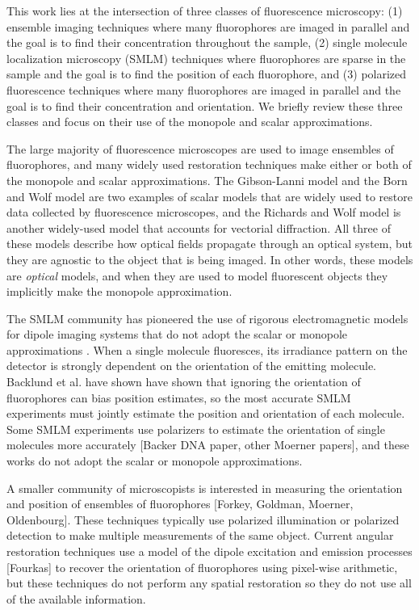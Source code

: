 \documentclass[]{osa-article}
\begin{document}
This work lies at the intersection of three classes of fluorescence microscopy:
(1) ensemble imaging techniques where many fluorophores are imaged in parallel
and the goal is to find their concentration throughout the sample, (2) single
molecule localization microscopy (SMLM) techniques where fluorophores are sparse
in the sample and the goal is to find the position of each fluorophore, and (3)
polarized fluorescence techniques where many fluorophores are imaged in parallel
and the goal is to find their concentration and orientation. We briefly review
these three classes and focus on their use of the monopole and scalar
approximations.

The large majority of fluorescence microscopes are used to image ensembles of
fluorophores, and many widely used restoration techniques make either or both of
the monopole and scalar approximations. The Gibson-Lanni model \cite{gibson89}
and the Born and Wolf model \cite{born1980} are two examples of scalar models
that are widely used to restore data collected by fluorescence microscopes, and
the Richards and Wolf model \cite{richards} is another widely-used model that
accounts for vectorial diffraction. All three of these models describe how
optical fields propagate through an optical system, but they are agnostic to the
object that is being imaged. In other words, these models are \textit{optical}
models, and when they are used to model fluorescent objects they implicitly make
the monopole approximation.

The SMLM community has pioneered the use of rigorous electromagnetic models for
dipole imaging systems that do not adopt the scalar or monopole approximations
\cite{backer2014, lieb2004, nov2006}. When a single molecule fluoresces, its
irradiance pattern on the detector is strongly dependent on the orientation of
the emitting molecule. Backlund et al. \cite{backlund2014} have shown have shown
that ignoring the orientation of fluorophores can bias position estimates, so
the most accurate SMLM experiments must jointly estimate the position and
orientation of each molecule. Some SMLM experiments use polarizers to estimate
the orientation of single molecules more accurately [Backer DNA paper, other
Moerner papers], and these works do not adopt the scalar or monopole
approximations.

A smaller community of microscopists is interested in measuring the orientation
and position of ensembles of fluorophores \cite{mehta2016} [Forkey, Goldman,
Moerner, Oldenbourg]. These techniques typically use polarized illumination or
polarized detection to make multiple measurements of the same object. Current
angular restoration techniques use a model of the dipole excitation and emission
processes [Fourkas] to recover the orientation of fluorophores using pixel-wise
arithmetic, but these techniques do not perform any spatial restoration so they
do not use all of the available information. 
\end{document}
